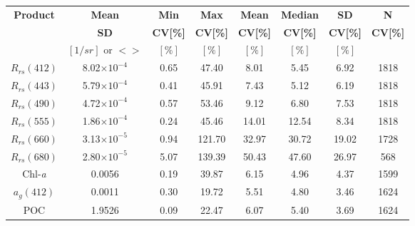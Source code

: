 \documentclass[preview]{standalone}
\begin{document}
\scriptsize
\centering
\begin{tabular}{cccccccc} 
\hline
\bfseries{Product} & \bfseries{Mean} & \bfseries{Min} & \bfseries{Max} & \bfseries{Mean} & \bfseries{Median} & \bfseries{SD} & \bfseries{N}\\
 & \bfseries{SD} & \bfseries{CV[\%]} & \bfseries{CV[\%]} & \bfseries{CV[\%]} & \bfseries{CV[\%]} & \bfseries{CV[\%]} & \bfseries{CV[\%]}\\ 
 & $[1/sr]$ or $<>$ & $[\%]$ & $[\%]$ & $[\%]$ & $[\%]$ & $[\%]$ \\ \hline \hline
$R_{rs}(412)$ 	& 8.02$\times10^{-4}$  & 0.65 &  47.40 	&   8.01 &  5.45 &  6.92 & 1818 \\ 
$R_{rs}(443)$ 	& 5.79$\times10^{-4}$  & 0.41 &  45.91 	&   7.43 &  5.12 &  6.19 & 1818 \\ 
$R_{rs}(490)$ 	& 4.72$\times10^{-4}$  & 0.57 &  53.46 	&   9.12 &  6.80 &  7.53 & 1818 \\ 
$R_{rs}(555)$ 	& 1.86$\times10^{-4}$  & 0.24 &  45.46 	&  14.01 & 12.54 &  8.34 & 1818 \\ 
$R_{rs}(660)$ 	& 3.13$\times10^{-5}$  & 0.94 & 121.70 	&  32.97 & 30.72 & 19.02 & 1728 \\ 
$R_{rs}(680)$ 	& 2.80$\times10^{-5}$  & 5.07 & 139.39 	&  50.43 & 47.60 & 26.97 &  568 \\ 
Chl-\it{a} 		&  0.0056              & 0.19 &  39.87  &   6.15 &  4.96 &  4.37 & 1599 \\
$a_{g}(412)$ 	&  0.0011              & 0.30 &  19.72  &   5.51 &  4.80 &  3.46 & 1624 \\
POC 			&  1.9526              & 0.09 &  22.47  &   6.07 &  5.40 &  3.69 & 1624 \\\hline
 \end{tabular}
\end{document}
